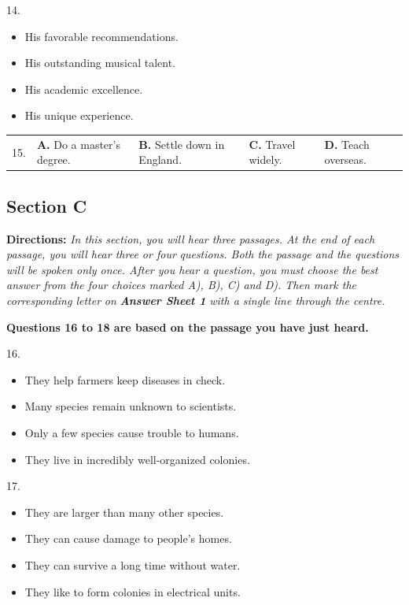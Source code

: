 \documentclass[UTF8,11pt]{ctexart}
\begin{document}
14.


\begin{itemize}[leftmargin=2em,itemsep=.2em,topsep=.4em]\item[A.] His favorable recommendations.
\item[B.] His outstanding musical talent.
\item[C.] His academic excellence.
\item[D.] His unique experience.
\end{itemize}

\noindent\begin{tabularx}{\linewidth}{@{}lXXXX@{}}15. & \textbf{A.} Do a master’s degree. & \textbf{B.} Settle down in England. & \textbf{C.} Travel widely. & \textbf{D.} Teach overseas.\\\end{tabularx}\par

\subsection*{\textbf{Section C}}


\textbf{Directions:}\textit{ In this section, you will hear three passages. At the end of each passage, you will hear three or four} \textit{questions. Both the passage and the questions will be spoken only once. After you hear a question, you must} \textit{choose the best answer from the four choices marked A), B), C) and D). Then mark the corresponding letter} \textit{on}\textbf{\textit{ Answer Sheet 1}}\textit{ with a single line through the centre.}


\textbf{Questions 16 to 18 are based on the passage you have just heard.}


16.


\begin{itemize}[leftmargin=2em,itemsep=.2em,topsep=.4em]\item[A.] They help farmers keep diseases in check.
\item[B.] Many species remain unknown to scientists.
\item[C.] Only a few species cause trouble to humans.
\item[D.] They live in incredibly well-organized colonies.
\end{itemize}

17.


\begin{itemize}[leftmargin=2em,itemsep=.2em,topsep=.4em]\item[A.] They are larger than many other species.
\item[B.] They can cause damage to people’s homes.
\item[C.] They can survive a long time without water.
\item[D.] They like to form colonies in electrical units.
\end{itemize}
\end{document}
